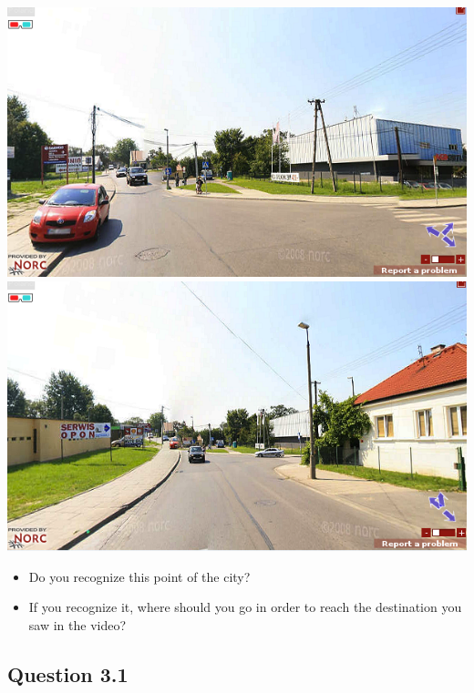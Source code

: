 \documentclass[12pt,a4paper,openright, notitlepage]{report}
\begin{document}
\includegraphics[width=\textwidth]{imgs/image-question23-1}
\includegraphics[width=\textwidth]{imgs/image-question23-2}

\begin{itemize}
	\item Do you recognize this point of the city?
	\item If you recognize it, where should you go in order to reach the destination you saw in the video?
\end{itemize}

\newpage

\subsection{Question 3.1}
\end{document}
